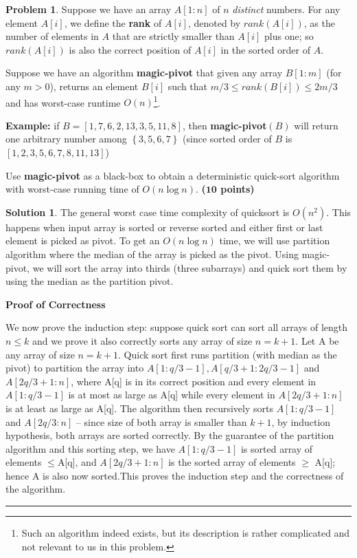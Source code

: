 \documentclass{article}
\theoremstyle{definition}
\newtheorem{problem}{Problem}
\def\fline{\rule{0.75\linewidth}{0.5pt}}
\newcommand{\finishline}{\begin{center}\fline\end{center}}
\newtheorem*{solution*}{Solution}
\newenvironment{solution}{\begin{solution*}}{{\finishline} \end{solution*}}
\newcommand{\grade}[1]{\hfill{\textbf{($\mathbf{#1}$ points)}}}
\newcommand{\set}[1]{\ensuremath{\left\{ #1 \right\}}}
\begin{document}
\begin{problem}
	Suppose we have an array $A[1:n]$ of $n$ \emph{distinct} numbers. For any element $A[i]$, we define the \textbf{rank} of $A[i]$, denoted by $rank(A[i])$, as the number of elements in $A$ that are strictly smaller than $A[i]$ plus one; so $rank(A[i])$ 
	is also the correct position of $A[i]$ in the sorted order of $A$. 
	
	Suppose we have an algorithm \textbf{magic-pivot} that given any array $B[1:m]$ (for any $m > 0$), returns an element $B[i]$ such that $m/3 \leq rank(B[i]) \leq 2m/3$ and has worst-case runtime $O(n)$\footnote{Such an algorithm indeed
	exists, but its description is rather complicated and not relevant to us in this problem.}. 

	\textbf{Example:} if $B=[1,7,6,2,13,3,5,11,8]$, then \textbf{magic-pivot}$(B)$ will return one arbitrary number among $\set{3,5,6,7}$ (since sorted order of $B$ is $[1,2,3,5,6,7,8,11,13]$)
	
	\begin{enumerate}
	\item[(a)] Use \textbf{magic-pivot} as a black-box to obtain a {deterministic} quick-sort algorithm with worst-case running time of $O(n\log{n})$. \grade{10}
	
	\begin{solution}
		\item The general worst case time complexity of quicksort is $O(n^2)$. This happens when input array is sorted or reverse sorted and either first or last element is picked as pivot. To get an $O(n \log n)$ time, we will use partition algorithm where the median of the array is picked as the pivot. Using magic-pivot, we will sort the array into thirds (three subarrays) and quick sort them by using the median as the partition pivot.

		\item \textbf{Proof of Correctness}
		\item We now prove the induction step: suppose quick sort can sort all arrays of length $n \leq k$ and we prove it also correctly sorts any array of size $n=k+ 1$.  Let A be any array of size $n=k+ 1$.  Quick sort first runs partition (with median as the pivot) to partition the array into $A[1 :q/3 -1], A[q/3 +1 : 2q/3 - 1 ]$ and $A[2q/3 + 1 :n]$, where A[q] is in its correct position and every element in $A[1 : q/3 -1]$ is at most as large as A[q] while every element in $A[2q/3 + 1 :n]$ is at least as large as A[q].  The algorithm then recursively sorts $A[1 : q/3 -1]$ and $A[2q/3 : n]$ – since size of both array is smaller than $k+ 1$, by induction hypothesis, both arrays are sorted correctly.  By the guarantee of the partition algorithm and this sorting step, we have $A[1 : q/3 - 1]$ is sorted array of elements $ \leq $A[q], and $A[2q/3 + 1 : n]$ is the sorted array of elements $\geq$ A[q]; hence A is also now sorted.This proves the induction step and the correctness of the algorithm.


\end{solution}
\end{enumerate}
\end{problem}
\end{document}
